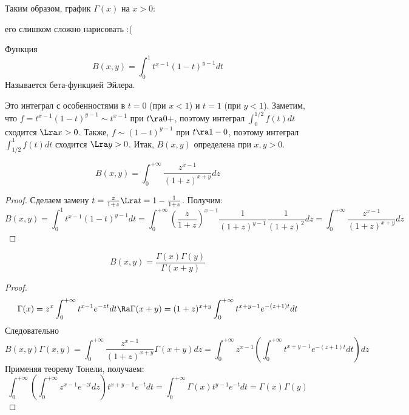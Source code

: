 Таким образом, график \(\Gamma(x)\) на \(x > 0\):
\begin{center}
    его слишком сложно нарисовать :(
\end{center}

\begin{definition}
    Функция
    \[B(x, y) = \int_0^1 t^{x - 1}(1 - t)^{y - 1}dt\]
    Называется бета-функцией Эйлера.
\end{definition}

\begin{note}
    Это интеграл с особенностями в \(t = 0\) (при \(x < 1\)) и \(t = 1\) (при \(y < 1\)). Заметим, что \(f = t^{x - 1}(1 - t)^{y - 1} \sim t^{x - 1}\) при \(t \ra 0+\), поэтому интеграл \(\int_0^{1/2} f(t)dt\) сходится \(\Lra x > 0\). Также, \(f \sim (1 - t)^{y - 1}\) при \(t \ra 1-0\), поэтому интеграл \(\int_{1/2}^1 f(t)dt\) сходится \(\Lra y > 0\). Итак, \(B(x, y)\) определена при \(x, y > 0\).
\end{note}


\begin{note}
    \[B(x, y) = \int_0^{+\infty}\frac{z^{x - 1}}{(1 + z)^{x + y}}dz\]
\end{note}
\begin{proof}
    Сделаем замену \(t = \frac{z}{1 + z} \Lra t = 1 - \frac{1}{1 + z}\). Получим:
    \[B(x, y) = \int_0^1 t^{x - 1}(1 - t)^{y - 1}dt = \int_0^{+\infty} \left( \frac{z}{1 + z} \right)^{x - 1}\frac{1}{(1 + z)^{y - 1}}\frac{1}{(1 + z)^2}dz = \int_0^{+\infty}\frac{z^{x - 1}}{(1 + z)^{x + y}}dz\]
\end{proof}

\begin{theorem}
    \[B(x, y) = \frac{\Gamma(x)\Gamma(y)}{\Gamma(x + y)}\]
\end{theorem}
\begin{proof}
    \[\Gamma(x) = z^x\int_0^{+\infty}t^{x - 1}e^{-zt}dt \Ra \Gamma(x + y) = (1 + z)^{x + y}\int_0^{+\infty}t^{x + y - 1}e^{-(z + 1)t}dt\]
    Следовательно
    \[B(x, y)\Gamma(x, y) = \int_0^{+\infty}\frac{z^{x - 1}}{(1 + z)^{x + y}}\Gamma(x + y)dz = \int_0^{+\infty}z^{x - 1}\left( \int_0^{+\infty}t^{x + y - 1}e^{-(z + 1)t} dt\right)dz\]
    Применяя теорему Тонели, получаем:
    \[\int_0^{+\infty}\left( \int_0^{+\infty} z^{x - 1}e^{-zt}dz \right)t^{x + y - 1}e^{-t}dt = \int_0^{+\infty}\Gamma(x)t^{y - 1}e^{-t}dt = \Gamma(x)\Gamma(y)\]
\end{proof}

